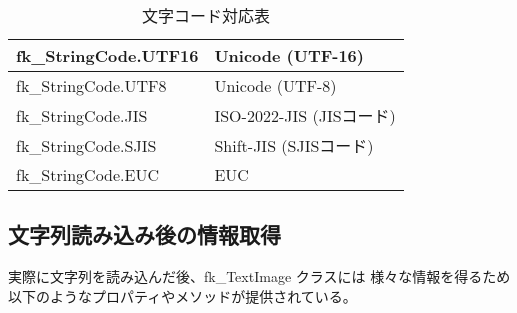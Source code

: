 \begin{table}[H]
\caption{文字コード対応表}
\label{tbl:stringCode}
\begin{center}
\begin{tabular}{|l|l|}
\hline
fk\_StringCode.UTF16 & Unicode (UTF-16) \\ \hline
fk\_StringCode.UTF8 & Unicode (UTF-8) \\ \hline
fk\_StringCode.JIS & ISO-2022-JIS (JISコード) \\ \hline
fk\_StringCode.SJIS & Shift-JIS (SJISコード) \\ \hline
fk\_StringCode.EUC & EUC \\ \hline
\end{tabular}
\end{center}
\end{table}

\subsection{文字列読み込み後の情報取得}
実際に文字列を読み込んだ後、fk\_TextImage クラスには
様々な情報を得るため以下のようなプロパティやメソッドが提供されている。

